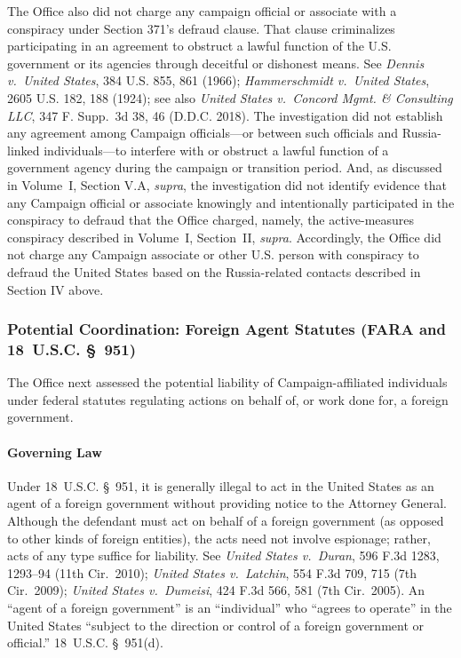 The Office also did not charge any campaign official or associate with a conspiracy under Section 371's defraud clause.
That clause criminalizes participating in an agreement to obstruct a lawful function of the U.S. government or its agencies through deceitful or dishonest means.
See \textit{Dennis v.\ United States}, 384 U.S. 855, 861 (1966); \textit{Hammerschmidt v.\ United States}, 2605 U.S. 182, 188 (1924); see also \textit{United States v.\ Concord Mgmt. \& Consulting LLC}, 347 F. Supp.~3d 38, 46 (D.D.C. 2018).
The investigation did not establish any agreement among Campaign officials---or between such officials and Russia-linked individuals---to interfere with or obstruct a lawful function of a government agency during the campaign or transition period.
And, as discussed in Volume~I, Section V.A, \textit{supra}, the investigation did not identify evidence that any Campaign official or associate knowingly and intentionally participated in the conspiracy to defraud that the Office charged, namely, the active-measures conspiracy described in Volume~I, Section~II, \textit{supra}.
Accordingly, the Office did not charge any Campaign associate or other U.S. person with conspiracy to defraud the United States based on the Russia-related contacts described in Section IV above.

\subsubsection{Potential Coordination: Foreign Agent Statutes (FARA and 18~U.S.C. \S~951)}
The Office next assessed the potential liability of Campaign-affiliated individuals under federal statutes regulating actions on behalf of, or work done for, a foreign government.

\paragraph{Governing Law}
Under 18~U.S.C. \S~951, it is generally illegal to act in the United States as an agent of a foreign government without providing notice to the Attorney General.
Although the defendant must act on behalf of a foreign government (as opposed to other kinds of foreign entities), the acts need not involve espionage; rather, acts of any type suffice for liability.
See \textit{United States v.\ Duran}, 596 F.3d 1283, 1293--94 (11th Cir.~2010); \textit{United States v.\ Latchin}, 554 F.3d 709, 715 (7th Cir.~2009); \textit{United States v.\ Dumeisi}, 424 F.3d 566, 581 (7th Cir.~2005).
An ``agent of a foreign government'' is an ``individual'' who ``agrees to operate'' in the United States ``subject to the direction or control of a foreign government or official.'' 18~U.S.C. \S~951(d).

